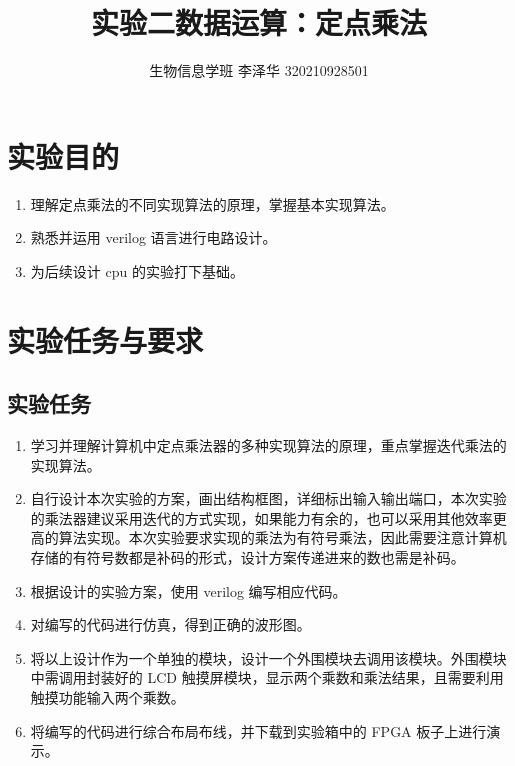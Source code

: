 \documentclass[AutoFakeBold]{LZUThesis}
\begin{document}
\title{{实验二数据运算：定点乘法}}


\author{生物信息学班 李泽华 320210928501}


\frontmatter



\customcontent

\mainmatter

\chapter{实验目的}
\begin{enumerate}
    \item 理解定点乘法的不同实现算法的原理，掌握基本实现算法。
    \item 熟悉并运用 verilog 语言进行电路设计。
    \item 为后续设计 cpu 的实验打下基础。
\end{enumerate}

\chapter{实验任务与要求}
\section{实验任务}
\begin{enumerate}
    \item 学习并理解计算机中定点乘法器的多种实现算法的原理，重点掌握迭代乘法的实现算法。
    \item 自行设计本次实验的方案，画出结构框图，详细标出输入输出端口，本次实验的乘法器建议采用迭代的方式实现，如果能力有余的，也可以采用其他效率更高的算法实现。本次实验要求实现的乘法为有符号乘法，因此需要注意计算机存储的有符号数都是补码的形式，设计方案传递进来的数也需是补码。
    \item 根据设计的实验方案，使用 verilog 编写相应代码。
    \item 对编写的代码进行仿真，得到正确的波形图。
    \item 将以上设计作为一个单独的模块，设计一个外围模块去调用该模块。外围模块中需调用封装好的 LCD 触摸屏模块，显示两个乘数和乘法结果，且需要利用触摸功能输入两个乘数。
    \item 将编写的代码进行综合布局布线，并下载到实验箱中的 FPGA 板子上进行演示。
\end{enumerate}
\end{document}
